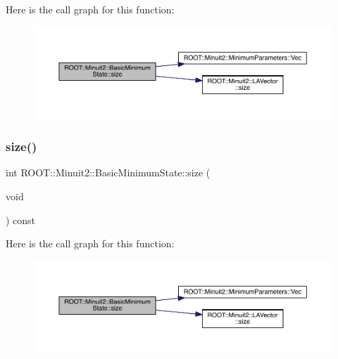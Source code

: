 Here is the call graph for this function\+:
\nopagebreak
\begin{figure}[H]
\begin{center}
\leavevmode
\includegraphics[width=350pt]{d0/db1/classROOT_1_1Minuit2_1_1BasicMinimumState_a12c3b0b51b127384c53029c54c984590_cgraph}
\end{center}
\end{figure}
\mbox{\label{classROOT_1_1Minuit2_1_1BasicMinimumState_a12c3b0b51b127384c53029c54c984590}} 
\subsubsection{\texorpdfstring{size()}{size()}\hspace{0.1cm}{\footnotesize\ttfamily [2/2]}}
{\footnotesize\ttfamily int R\+O\+O\+T\+::\+Minuit2\+::\+Basic\+Minimum\+State\+::size (\begin{DoxyParamCaption}\item[{void}]{ }\end{DoxyParamCaption}) const\hspace{0.3cm}{\ttfamily [inline]}}

Here is the call graph for this function\+:
\nopagebreak
\begin{figure}[H]
\begin{center}
\leavevmode
\includegraphics[width=350pt]{d0/db1/classROOT_1_1Minuit2_1_1BasicMinimumState_a12c3b0b51b127384c53029c54c984590_cgraph}
\end{center}
\end{figure}
\mbox{\label{classROOT_1_1Minuit2_1_1BasicMinimumState_a43ea742b5bd55d2c4e9d6b75308fb875}} 
